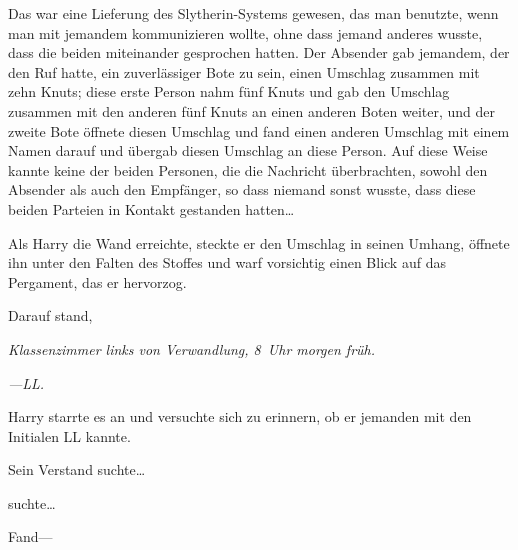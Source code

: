 Das war eine Lieferung des Slytherin-Systems gewesen, das man benutzte, wenn man mit jemandem kommunizieren wollte, ohne dass jemand anderes wusste, dass die beiden miteinander gesprochen hatten. Der Absender gab jemandem, der den Ruf hatte, ein zuverlässiger Bote zu sein, einen Umschlag zusammen mit zehn Knuts; diese erste Person nahm fünf Knuts und gab den Umschlag zusammen mit den anderen fünf Knuts an einen anderen Boten weiter, und der zweite Bote öffnete diesen Umschlag und fand einen anderen Umschlag mit einem Namen darauf und übergab diesen Umschlag an diese Person. Auf diese Weise kannte keine der beiden Personen, die die Nachricht überbrachten, sowohl den Absender als auch den Empfänger, so dass niemand sonst wusste, dass diese beiden Parteien in Kontakt gestanden hatten…

Als Harry die Wand erreichte, steckte er den Umschlag in seinen Umhang, öffnete ihn unter den Falten des Stoffes und warf vorsichtig einen Blick auf das Pergament, das er hervorzog.

Darauf stand,

\emph{Klassenzimmer links von Verwandlung, 8~Uhr morgen früh.}

\emph{—LL.}

Harry starrte es an und versuchte sich zu erinnern, ob er jemanden mit den Initialen LL kannte.

Sein Verstand suchte…

suchte…

Fand—

